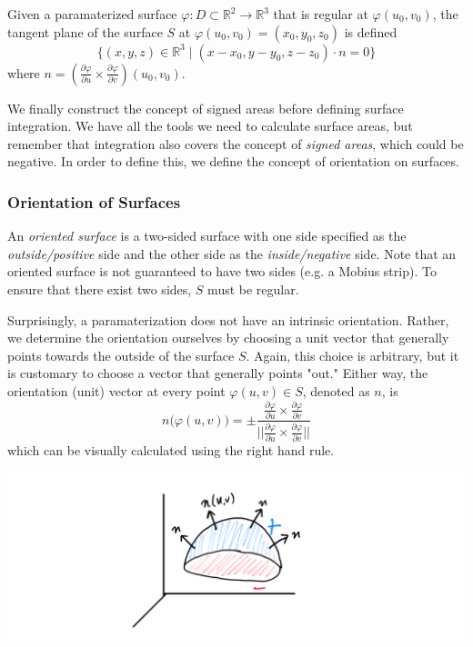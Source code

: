   \begin{definition}
  Given a paramaterized surface $\varphi: D \subset \mathbb{R}^2 \longrightarrow \mathbb{R}^3$ that is regular at $\varphi(u_0, v_0)$, the tangent plane of the surface $S$ at $\varphi(u_0, v_0) = (x_0, y_0, z_0)$ is defined
  \[\{(x, y, z) \in \mathbb{R}^3 \;|\; (x-x_0, y-y_0, z-z_0) \cdot n = 0\}\]
  where $n = (\frac{\partial \varphi}{\partial u} \times \frac{\partial \varphi}{\partial v})(u_0, v_0)$. 
  \end{definition}

  We finally construct the concept of signed areas before defining surface integration. 
  We have all the tools we need to calculate surface areas, but remember that integration also covers the concept of \textit{signed areas}, which could be negative. In order to define this, we define the concept of orientation on surfaces. 

  \subsubsection{Orientation of Surfaces}

  \begin{definition}
  An \textit{oriented surface} is a two-sided surface with one side specified as the \textit{outside/positive} side and the other side as the \textit{inside/negative} side. Note that an oriented surface is not guaranteed to have two sides (e.g. a Mobius strip). To ensure that there exist two sides, $S$ must be regular. 

  Surprisingly, a paramaterization does not have an intrinsic orientation. Rather, we determine the orientation ourselves by choosing a unit vector that generally points towards the outside of the surface $S$. Again, this choice is arbitrary, but it is customary to choose a vector that generally points "out." Either way, the orientation (unit) vector at every point $\varphi(u, v) \in S$, denoted as $n$, is 
  \[n\big(\varphi(u, v)\big) = \pm \frac{\frac{\partial \varphi}{\partial u} \times \frac{\partial \varphi}{\partial v}}{\big|\big|\frac{\partial \varphi}{\partial u} \times \frac{\partial \varphi}{\partial v}\big|\big|}\]
  which can be visually calculated using the right hand rule. 
  \begin{center}
      \includegraphics[scale=0.23]{img/Orientation_Unit_Vector.PNG}
  \end{center}
  \end{definition}

